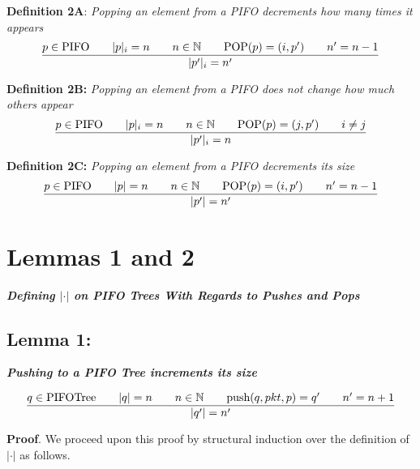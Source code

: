 \documentclass{article}
\begin{document}
\hfill\break

\noindent \textbf{Definition 2A}: \textit{Popping an element from a PIFO decrements how many times it appears}
 $$\frac{p \in \text{PIFO}  \hspace{0.7cm} |p|_i = n \hspace{0.7cm} n \in \mathbb{N} \hspace{0.7cm} \text{POP}(p) = (i, p') \hspace{0.7cm} n' = n-1}{|p'|_i = n'}$$

\noindent \textbf{Definition 2B:} \textit{Popping an element from a PIFO does not change how much others appear}
$$\frac{p \in \text{PIFO}  \hspace{0.7cm} |p|_i = n \hspace{0.7cm} n \in \mathbb{N} \hspace{0.7cm} \text{POP}(p) = (j, p') \hspace{0.7cm} i \neq j}{|p'|_i = n}$$

\noindent \textbf{Definition 2C:} \textit{Popping an element from a PIFO decrements its size}
$$\frac{p \in \text{PIFO}  \hspace{0.7cm} |p| = n \hspace{0.7cm} n \in \mathbb{N} \hspace{0.7cm} \text{POP}(p) = (i, p') \hspace{0.7cm} n' = n-1}{|p'| = n'}$$\newpage

\section{Lemmas 1 and 2}
\noindent \textbf{\textit{Defining $|\cdot|$ on PIFO Trees With Regards to Pushes and Pops}}\newline

\subsection{Lemma 1:}

\noindent \textbf{\textit{Pushing to a PIFO Tree increments its size}}

$$\frac{q \in \text{PIFOTree} \hspace{0.7cm} |q| = n \hspace{0.7cm} n \in \mathbb{N} \hspace{0.7cm} \text{push}(q, pkt, p) = q' \hspace{0.7cm} n' = n+1}{|q'| = n'}$$

\noindent \textbf{Proof}. We proceed upon this proof by structural induction over the definition of $|\cdot|$ as follows.\newline
\end{document}
